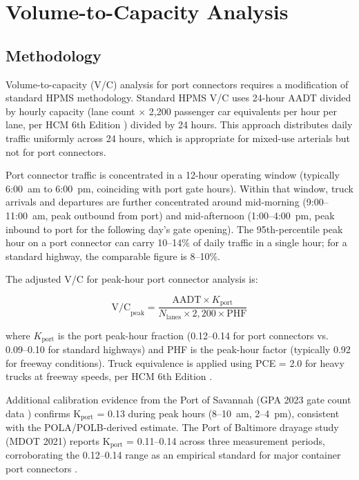 \section{Volume-to-Capacity Analysis}
\label{sec:vc}

\subsection{Methodology}

Volume-to-capacity (V/C) analysis for port connectors requires a modification of standard HPMS methodology. Standard HPMS V/C uses 24-hour AADT divided by hourly capacity (lane count $\times$ 2,200 passenger car equivalents per hour per lane, per HCM 6th Edition \citep{HCM6}) divided by 24 hours. This approach distributes daily traffic uniformly across 24 hours, which is appropriate for mixed-use arterials but not for port connectors.

Port connector traffic is concentrated in a 12-hour operating window (typically 6:00~am to 6:00~pm, coinciding with port gate hours). Within that window, truck arrivals and departures are further concentrated around mid-morning (9:00--11:00~am, peak outbound from port) and mid-afternoon (1:00--4:00~pm, peak inbound to port for the following day's gate opening). The 95th-percentile peak hour on a port connector can carry 10--14\% of daily traffic in a single hour; for a standard highway, the comparable figure is 8--10\%.

The adjusted V/C for peak-hour port connector analysis is:

\begin{equation}
  \text{V/C}_{\text{peak}} = \frac{\text{AADT} \times K_{\text{port}}}{N_{\text{lanes}} \times 2,200 \times \text{PHF}}
  \label{eq:vc}
\end{equation}

where $K_{\text{port}}$ is the port peak-hour fraction (0.12--0.14 for port connectors vs. 0.09--0.10 for standard highways) and PHF is the peak-hour factor (typically 0.92 for freeway conditions). Truck equivalence is applied using PCE = 2.0 for heavy trucks at freeway speeds, per HCM 6th Edition \citep{HCM6}.

Additional calibration evidence from the Port of Savannah (GPA 2023 gate count data \citep{GPA2023}) confirms K$_{\text{port}}$ = 0.13 during peak hours (8--10~am, 2--4~pm), consistent with the POLA/POLB-derived estimate. The Port of Baltimore drayage study (MDOT 2021) reports K$_{\text{port}}$ = 0.11--0.14 across three measurement periods, corroborating the 0.12--0.14 range as an empirical standard for major container port connectors \citep{MDOT_Drayage2021}.

